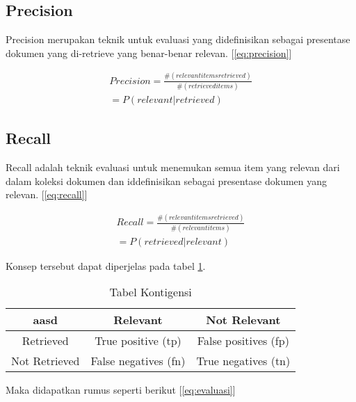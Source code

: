\subsection*{Precision}
Precision merupakan teknik untuk evaluasi yang didefinisikan sebagai presentase dokumen yang di-retrieve yang benar-benar relevan. [\ref{eq:precision}]

\begin{equation}
\begin{split}
Precision = \frac{\#(relevant items retrieved)}{\#(retrieved items)} \\ 
= P(relevant|retrieved)
\label{eq:precision}
\end{split}
\end{equation}

\subsection*{Recall}
Recall adalah teknik evaluasi untuk menemukan semua item yang relevan dari dalam koleksi dokumen dan iddefinisikan sebagai presentase dokumen yang relevan. [\ref{eq:recall}]

\begin{equation}
\begin{split}
Recall = \frac{\#(relevant items retrieved)}{\#(relevant items)} \\ 
= P(retrieved|relevant)
\label{eq:recall}
\end{split}
\end{equation}

Konsep tersebut dapat diperjelas pada tabel \ref{tab:konsep}.

\begin{table}[hbt]
	\caption{Tabel Kontigensi}
	\centering
	\begin{adjustbox}{max width=\textwidth}
		\begin{tabular}{*{3}{c}}%
			\toprule
			aasd & Relevant & Not Relevant \\
			\midrule
			Retrieved & True positive (tp) & False positives (fp) \\
			Not Retrieved & False negatives (fn) & True negatives (tn) \\
			\bottomrule
		\end{tabular}
	\end{adjustbox}
	\label{tab:konsep}
\end{table}

Maka didapatkan rumus seperti berikut [\ref{eq:evaluasi}]

